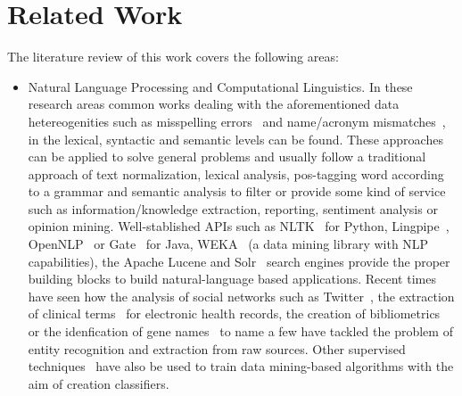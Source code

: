 \documentclass{llncs}
\begin{document}
\section{Related Work}
The literature review of this work covers the following areas:
\begin{itemize}
 \item Natural Language Processing and Computational Linguistics. In these research areas common works dealing with the aforementioned data hetereogenities 
   such as misspelling errors~\cite{NorvigSpelling,StanfordSpelling} and name/acronym mismatches~\cite{Yeates99automaticextraction,Ratinov:2004:AES:1025132.1026366}, 
  in the lexical, syntactic and semantic levels can be found. These approaches can be applied to solve general problems and usually follow a 
  traditional approach of text normalization, lexical analysis, pos-tagging word according to a grammar and semantic analysis to filter or 
  provide some kind of service such as information/knowledge extraction, reporting, sentiment analysis or opinion mining. 
  Well-stablished APIs such as NLTK~\cite{LoperBird02} for Python, Lingpipe~\cite{Lingpipe}, OpenNLP~\cite{OpenNLP} or Gate~\cite{Gate} for Java, WEKA~\cite{read12:_scalab} 
  (a data mining library with NLP capabilities), the Apache Lucene and Solr~\cite{rafa2011apache} search engines provide the proper building blocks to build natural-language based applications. 
  Recent times have seen how the analysis of social networks such as Twitter~\cite{Li:2012:TNE:2348283.2348380,Gimpel:2011:PTT:2002736.2002747}, the extraction of 
  clinical terms~\cite{Wang:2009:ARN:1667884.1667888} for electronic health records, the creation of bibliometrics~\cite{Galvez2006,Morillo:2013:TAA:2424697.2424727} or 
  the idenfication of gene names~\cite{Krauthammer:2004:TIB:1053007.1053018,Galvez2012} to name a few have tackled the problem of entity recognition and extraction from raw sources. 
  Other supervised techniques~\cite{Bohn:2006:PHD} have also be used to train data mining-based algorithms with the aim of creation classifiers.
 

\end{itemize}
\end{document}
